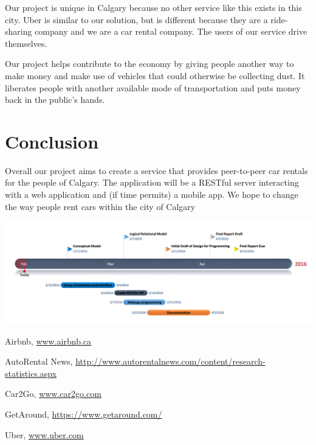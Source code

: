\documentclass{article}
\begin{document}
Our project is unique in Calgary because no other service like this exists in
this city. Uber is similar to our solution, but is different because they are a
ride-sharing company and we are a car rental company. The users of our service
drive themselves.

Our project helps contribute to the economy by giving people another way to
make money and make use of vehicles that could otherwise be collecting dust. It
liberates people with another available mode of transportation and puts money
back in the public's hands.

\section{Conclusion}
Overall our project aims to create a service that provides peer-to-peer car rentals for the people of Calgary.
The application will be a RESTful server interacting with a web application and (if time permits) a mobile app.
We hope to change the way people rent cars within the city of Calgary

\includegraphics[scale=0.45,keepaspectratio]{Timeline}
\begin{thebibliography}{9}

  Airbnb,
  \url{www.airbnb.ca}

  AutoRental News,
  \url{http://www.autorentalnews.com/content/research-statistics.aspx}

  Car2Go,
  \url{www.car2go.com}

  GetAround,
  \url{https://www.getaround.com/}

  Uber,
  \url{www.uber.com}

\end{thebibliography}
\end{document}
